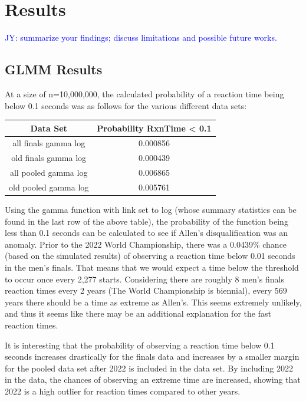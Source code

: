 \documentclass[12pt, letterpaper, titlepage]{article}
\newcommand{\jy}[1]{\textcolor{blue}{JY: #1}}
\begin{document}
\section{Results} \label{sec:Results}
\jy{summarize your findings; discuss limitations and possible future works.}


\subsection{GLMM Results}
At a size of n=10,000,000, the calculated probability of a reaction
time being below 0.1 seconds was as follows for the various different data sets:

\begin{center}
  \begin{tabular}{|c c|} 
   \hline
   Data Set & Probability RxnTime < 0.1 \\ 
   \hline\hline
   all finals gamma log & 0.000856 \\ 
   \hline
   old finals gamma log & 0.000439 \\
   \hline
   all pooled gamma log & 0.006865 \\
   \hline
   old pooled gamma log & 0.005761 \\
  \end{tabular}
  \end{center}

Using the gamma function with link set to log (whose summary statistics can be
found in the last row of the above table), the probability of the function being
less than 0.1 seconds can be calculated to see if Allen's disqualification was an anomaly.
Prior to the 2022 World Championship, there was a 0.0439\% chance (based on the
simulated results) of observing a reaction time below 0.01 seconds in the men's
finals.  That means that we would expect a time below the threshold to occur
once every 2,277 starts.  Considering there are roughly 8 men's finals reaction
times every 2 years (The World Championship is biennial), every 569 years there
should be a time as extreme as Allen's.  This seems extremely unlikely, and thus
it seems like there may be an additional explanation for the fast reaction times.

It is interesting that the probability of observing a reaction time below 0.1
seconds increases drastically for the finals data and increases by a smaller margin
for the pooled data set after 2022 is included in the data set.  By including 2022
in the data, the chances of observing an extreme time are increased, showing that
2022 is a high outlier for reaction times compared to other years.
\end{document}
